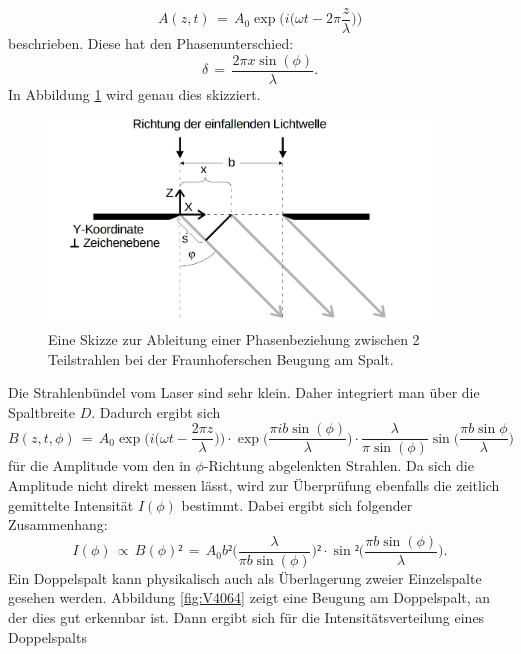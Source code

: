 \documentclass[
  bibliography=totoc,     %
  captions=tableheading,  %
  titlepage=firstiscover, %
]{scrartcl}
\begin{document}
\begin{equation}
  A(z,t)\,=\,A_0\exp\Big(i\Big(\omega t-2\pi \frac{z}{\lambda}\Big)\Big)
  \label{eqn:welle}
\end{equation}
beschrieben. Diese hat den Phasenunterschied:
\begin{equation}
  \delta\,=\,\frac{2\pi x\sin(\phi)}{\lambda}.
  \label{eqn:phasenunterschied}
\end{equation}
In Abbildung \ref{fig:V4065} wird genau dies skizziert.
\begin{figure}[htb]
  \centering
  \includegraphics[width=0.9\textwidth]{V4065.png}
  \caption{Eine Skizze zur Ableitung einer Phasenbeziehung zwischen 2 Teilstrahlen bei der Fraunhoferschen Beugung am Spalt. \cite{anleitung}}
  \label{fig:V4065}
\end{figure}
Die Strahlenbündel vom Laser sind sehr klein. Daher integriert man über die Spaltbreite $D$. Dadurch ergibt sich
\begin{equation}
  B(z,t,\phi)\,=\,A_0\exp\Big(i\Big(\omega t-\frac{2\pi z}\lambda\Big)\Big)\cdot \exp\Big(\frac{\pi ib \sin(\phi)}{\lambda}\Big)\cdot\frac{\lambda}{\pi \sin(\phi)}\sin\Big(\frac{\pi b\sin{\phi}}{\lambda}\Big)
  \label{eqn:amplitude}
\end{equation}
für die Amplitude vom den in $\phi$-Richtung abgelenkten Strahlen. Da sich die Amplitude nicht direkt messen lässt, wird zur Überprüfung ebenfalls die zeitlich gemittelte Intensität $I(\phi)$ bestimmt. Dabei ergibt sich folgender Zusammenhang:
\begin{equation}
  I(\phi)\,\propto\,B(\phi)²\,=\,A_0 b²\Big(\frac{\lambda}{\pi b\sin(\phi)}\Big)²\cdot \sin²\Big(\frac{\pi b\sin(\phi)}{\lambda}\Big).
  \label{eqn:intensitätsverteilungeinzel}
\end{equation}
Ein Doppelspalt kann physikalisch auch als Überlagerung zweier Einzelspalte gesehen werden. Abbildung \ref{fig:V4064} zeigt eine Beugung am Doppelspalt, an der dies gut erkennbar ist. Dann ergibt sich für die Intensitätsverteilung eines Doppelspalts
\end{document}
